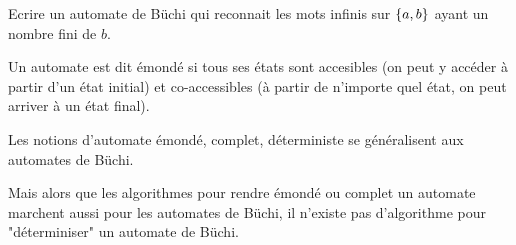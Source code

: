 \begin{exercice}
	Ecrire un automate de Büchi qui reconnait les mots infinis sur $\left\{a,b\right\}$ ayant un nombre fini de $b$. \\
	\begin{minipage}{0.3\textwidth}
	\end{minipage}
	\begin{minipage}{0.3\textwidth}
	\end{minipage}
	\begin{minipage}{0.3\textwidth}
	\end{minipage}
\end{exercice}


\begin{definition}
	Un automate est dit émondé si tous ses états sont accesibles (on peut y accéder à partir d'un état initial)
	et co-accessibles (à partir de n'importe quel état, on peut arriver à un état final).
\end{definition}

Les notions d'automate émondé, complet, déterministe se généralisent aux automates de Büchi.


Mais alors que les algorithmes pour rendre émondé ou complet un automate marchent aussi
pour les automates de Büchi, il n'existe pas d'algorithme pour "déterminiser" un automate de Büchi.

